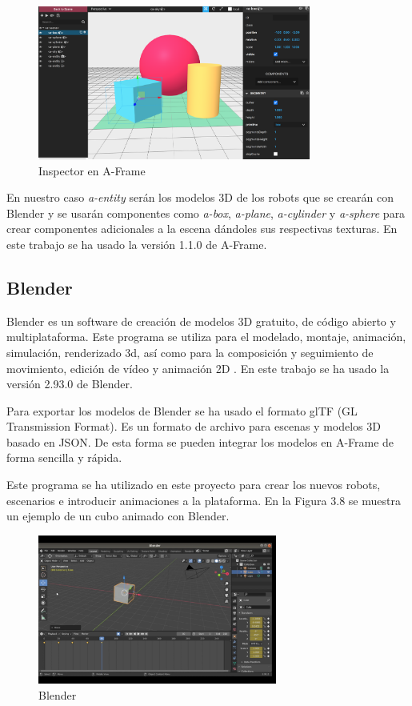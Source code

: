 \begin{figure}[H]
    \centering
    \includegraphics[width=0.8\textwidth, height=0.5\textwidth]{chapters/images/inspectoraframe.png}
    \caption{Inspector en A-Frame}
    \label{fig:my_label}
\end{figure}


En nuestro caso \textit{a-entity} serán los modelos 3D de los robots que se crearán con Blender  y se usarán componentes como \textit{a-box}, \textit{a-plane}, \textit{a-cylinder} y \textit{a-sphere} para crear componentes adicionales a la escena dándoles sus respectivas texturas. En este trabajo se ha usado la versión 1.1.0 de A-Frame.

\subsection{Blender}
Blender es un software de creación de modelos 3D gratuito, de código abierto y multiplataforma. Este programa se utiliza para el modelado, montaje, animación, simulación, renderizado 3d, así como para la  composición y seguimiento de movimiento, edición de vídeo y animación 2D
\cite{blender}. En este trabajo se ha usado la versión 2.93.0 de Blender.

Para exportar los modelos de Blender se ha usado el formato glTF (GL Transmission Format). Es un formato de archivo para escenas y modelos 3D basado en JSON. De esta forma se pueden integrar los modelos en A-Frame de forma sencilla y rápida.

Este programa se ha utilizado en este proyecto para crear los nuevos robots, escenarios e introducir animaciones a la plataforma. En la Figura 3.8 se muestra un ejemplo de un cubo animado con Blender. 

\begin{figure}[H]
    \centering
    \includegraphics[width=0.7\textwidth, height=0.4\textwidth]{chapters/images/blender.png}
    \caption{Blender}
    \label{fig:my_label}
\end{figure}

